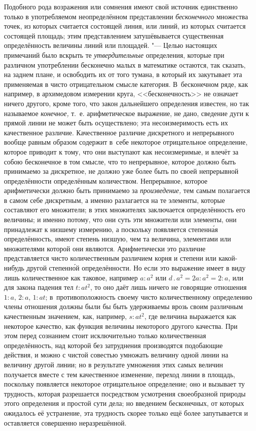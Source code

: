 Подобного рода возражения или сомнения имеют свой источник единственно только в
употребляемом неопределённом представлении {\em бесконечного} множества точек,
из которых считается состоящей линия, или линий, из которых считается состоящей
площадь; этим представлением затушёвывается существенная определённость
величины линий или площадей. "--- Целью настоящих примечаний было вскрыть те
{\em утвердительные} определения, которые при различном употреблении
бесконечно малых в математике остаются, так сказать, на заднем плане, и
освободить их от того тумана, в который их закутывает эта применяемая в чисто
отрицательном смысле категория. В~бесконечном ряде, как например, в архимедовом
измерении круга, <<бесконечность>> не означает ничего другого, кроме того, что
закон дальнейшего определения известен, но так называемое {\em конечное,} т.~е.
арифметическое выражение, не дано, сведение дуги к прямой линии не может быть
осуществлено; эта несоизмеримость есть их качественное различие. Качественное
различие дискретного и непрерывного вообще равным образом содержит в~себе
некоторое отрицательное определение, которое приводит к тому, что они выступают
как несоизмеримые, и влечёт за собою бесконечное в том смысле, что то
непрерывное, которое должно быть принимаемо за дискретное, не должно уже более
быть по своей непрерывной определённости определённым количеством. Непрерывное,
которое арифметически должно быть принимаемо за {\em произведение,} тем самым
полагается в самом себе дискретным, а именно разлагается на те элементы,
которые составляют его множители; в этих множителях заключается определённость
его величины; и именно потому, что они суть эти множители или элементы, они
принадлежат к низшему измерению, а поскольку появляется степенн\'{а}я
определённость, имеют степень низшую, чем та величина, элементами или
множителями которой они являются. Арифметически это различие представляется
чисто количественным различием корня и степени или какой-нибудь другой
степенн\'{о}й определённости. Но если это выражение имеет в виду лишь
количественное как таковое, например $a:a^2$ или $d\,.\,a^2=2a:a^2=2:a$, или
для закона падения тел $t:at^2$, то оно даёт лишь ничего не говорящие отношения
$1:a$, $2:a$, $1:at$; в~противоположность своему чисто количественному
определению члены отношения должны были бы быть удерживаемы врозь своим
различным качественным значением, как, например, $s:at^2$, где величина
выражается как некоторое качество, как функция величины некоторого другого
качества. При этом перед сознанием стоит исключительно только количественная
определённость, над которой без затруднения производятся подобающие действия,
и можно с чистой совестью умножать величину одной линии на величину другой
линии; но в результате умножения этих самых величин получается вместе с тем
качественное изменение, переход линии в площадь, поскольку появляется некоторое
отрицательное определение; оно и вызывает ту трудность, которая разрешается
посредством усмотрения своеобразной природы этого определения и простой сути
дела; но введением бесконечных, от которых ожидалось её устранение, эта
трудность скорее только ещё более запутывается и оставляется совершенно
неразрешённой.
